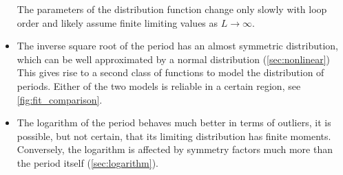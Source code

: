 \documentclass[11pt,a4paper]{article}
\renewcommand{\|}{\rule[-0.4ex]{0.2ex}{1.2em}}
\begin{document}
\begin{itemize}
	 The parameters of the distribution function change  only slowly with loop order and likely assume finite limiting values as $L\rightarrow \infty$. 
	  \item The inverse square root of the period has an almost symmetric distribution, which can be well approximated by a normal distribution (\cref{sec:nonlinear}) This gives rise to a second class of functions to model the distribution of periods. Either of the two models is reliable in a certain region, see \cref{fig:fit_comparison}.
	 \item The logarithm of the period behaves much better in terms of outliers, it is possible, but not certain, that its limiting distribution has finite moments. Conversely, the logarithm is affected by symmetry factors much more than the  period itself (\cref{sec:logarithm}).
\end{itemize}
	
\end{document}
